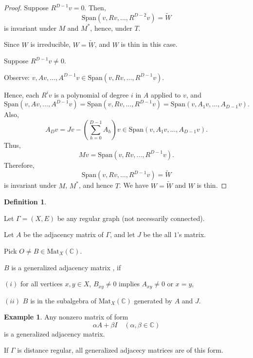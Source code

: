 \documentclass[
]{book}
\theoremstyle{definition}
\newtheorem{definition}{Definition}[chapter]
\theoremstyle{definition}
\newtheorem{example}{Example}[chapter]
\theoremstyle{definition}
\theoremstyle{definition}
\theoremstyle{remark}
\begin{document}
\begin{proof}
Suppose \(R^{D-1}v = 0\). Then,
\[\mathrm{Span}(v, Rv, \ldots, R^{D-2}v) = \widetilde{W}\]
is invariant under \(M\) and \(M^*\), hence, under \(T\).

Since \(W\) is irreducible, \(W = \widetilde{W}\), and \(W\) is thin in this case.

Suppose \(R^{D-1}v \neq 0\).

Observe: \(v, Av, \ldots, A^{D-1}v \in \mathrm{Span}(v, Rv, \ldots, R^{D-1}v)\).

Hence, each \(R^iv\) is a polynomial of degree \(i\) in \(A\) applied to \(v\), and
\[\mathrm{Span}(v, Av, \ldots, A^{D-1}v) = \mathrm{Span}(v, Rv, \ldots, R^{D-1}v) = \mathrm{Span}(v, A_1v, \ldots, A_{D-1}v).\]
Also,
\[A_Dv = Jv - \left(\sum_{h=0}^{D-1}A_h\right)v \in \mathrm{Span}(v, A_1v, \ldots, A_{D-1}v).\]
Thus,
\[Mv = \mathrm{Span}(v, Rv, \ldots, R^{D-1}v).\]
Therefore,
\[\mathrm{Span}(v, Rv, \ldots, R^{D-1}v) = \widetilde{W}\]
is invariant under \(M\), \(M^*\), and hence \(T\). We have \(W = \widetilde{W}\) and \(W\) is thin.
\end{proof}

\begin{definition}
\protect\hypertarget{def:generalized-adjacency-matrix}{}\label{def:generalized-adjacency-matrix}

Let \(\Gamma = (X,E)\) be any regular graph (not necessarily connected).

Let \(A\) be the adjacency matrix of \(\Gamma\), and let \(J\) be the all \(1\)'s matrix.

Pick \(O\neq B \in \mathrm{Mat}_X(\mathbb{C})\).

\(B\) is a generalized adjacency matrix , if

\((i)\) for all vertices \(x,y\in X\), \(B_{xy}\neq 0\) implies \(A_{xy}\neq 0\) or \(x = y\),

\((ii)\) \(B\) is in the subalgebra of \(\mathrm{Mat}_X(\mathbb{C})\) generated by \(A\) and \(J\).

\end{definition}

\begin{example}
\protect\hypertarget{exm:generalized-adjacecy-matrix}{}\label{exm:generalized-adjacecy-matrix}Any nonzero matrix of form
\[\alpha A + \beta I \quad (\alpha, \beta\in \mathbb{C})\]
is a generalized adjacency matrix.

If \(\Gamma\) is distance regular, all generalized adjacecy matrices are of this form.
\end{example}
\end{document}
